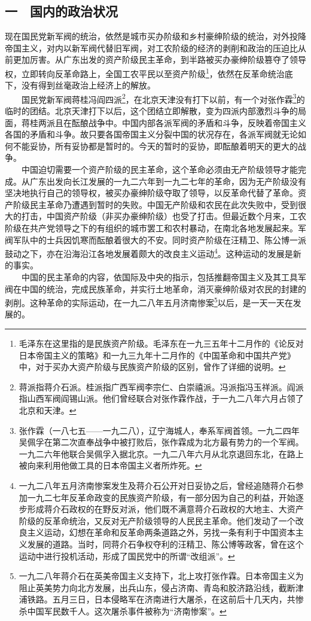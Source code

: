 \documentclass[cn,11pt,chinese]{elegantbook}
\def\myformat#1{\hfil\hfil #1}
\begin{document}
\subsection*{\myformat{一　国内的政治状况}}
现在国民党新军阀的统治，依然是城市买办阶级和乡村豪绅阶级的统治，对外投降帝国主义，对内以新军阀代替旧军阀，对工农阶级的经济的剥削和政治的压迫比从前更加厉害。从广东出发的资产阶级民主革命，到半路被买办豪绅阶级篡夺了领导权，立即转向反革命路上，全国工农平民以至资产阶级\footnote[1]{ 毛泽东在这里指的是民族资产阶级。毛泽东在一九三五年十二月作的《论反对日本帝国主义的策略》和一九三九年十二月作的《中国革命和中国共产党》中，对于买办大资产阶级与民族资产阶级的区别，曾作了详细的说明。}，依然在反革命统治底下，没有得到丝毫政治上经济上的解放。\\
　　国民党新军阀蒋桂冯阎四派\footnote[2]{ 蒋派指蒋介石派。桂派指广西军阀李宗仁、白崇禧派。冯派指冯玉祥派。阎派指山西军阀阎锡山派。他们曾经联合对张作霖作战，于一九二八年六月占领了北京和天津。}，在北京天津没有打下以前，有一个对张作霖\footnote[3]{ 张作霖（一八七五——一九二八），辽宁海城人，奉系军阀首领。一九二四年吴佩孚在第二次直奉战争中被打败后，张作霖成为北方最有势力的一个军阀。一九二六年他联合吴佩孚入据北京。一九二八年六月从北京退回东北，在路上被向来利用他做工具的日本帝国主义者所炸死。}的临时的团结。北京天津打下以后，这个团结立即解散，变为四派内部激烈斗争的局面，蒋桂两派且在酝酿战争中。中国内部各派军阀的矛盾和斗争，反映着帝国主义各国的矛盾和斗争。故只要各国帝国主义分裂中国的状况存在，各派军阀就无论如何不能妥协，所有妥协都是暂时的。今天的暂时的妥协，即酝酿着明天的更大的战争。\\
　　中国迫切需要一个资产阶级的民主革命，这个革命必须由无产阶级领导才能完成。从广东出发向长江发展的一九二六年到一九二七年的革命，因为无产阶级没有坚决地执行自己的领导权，被买办豪绅阶级夺取了领导，以反革命代替了革命。资产阶级民主革命乃遭遇到暂时的失败。中国无产阶级和农民在此次失败中，受到很大的打击，中国资产阶级（非买办豪绅阶级）也受了打击。但最近数个月来，工农阶级在共产党领导之下的有组织的城市罢工和农村暴动，在南北各地发展起来。军阀军队中的士兵因饥寒而酝酿着很大的不安。同时资产阶级在汪精卫、陈公博一派鼓动之下，亦在沿海沿江各地发展着颇大的改良主义运动\footnote[4]{ 一九二八年五月济南惨案发生及蒋介石公开对日妥协之后，曾经追随蒋介石参加一九二七年反革命政变的民族资产阶级，有一部分因为自己的利益，开始逐步形成蒋介石政权的在野反对派，他们既不满意蒋介石政权的大地主、大资产阶级的反革命统治，又反对无产阶级领导的人民民主革命。他们发动了一个改良主义运动，幻想在革命和反革命两条道路之外，另找一条有利于中国资本主义发展的道路。当时，同蒋介石争权夺利的汪精卫、陈公博等政客，曾在这个运动中进行投机活动，形成了国民党中的所谓“改组派”。}。这种运动的发展是新的事实。\\
　　中国的民主革命的内容，依国际及中央的指示，包括推翻帝国主义及其工具军阀在中国的统治，完成民族革命，并实行土地革命，消灭豪绅阶级对农民的封建的剥削。这种革命的实际运动，在一九二八年五月济南惨案\footnote[5]{ 一九二八年蒋介石在英美帝国主义支持下，北上攻打张作霖。日本帝国主义为阻止英美势力向北方发展，出兵山东，侵占济南、青岛和胶济路沿线，截断津浦铁路。五月三日，日本侵略军在济南进行大屠杀，在这前后十几天内，共惨杀中国军民数千人。这次屠杀事件被称为“济南惨案”。}以后，是一天一天在发展的。\\
\end{document}
